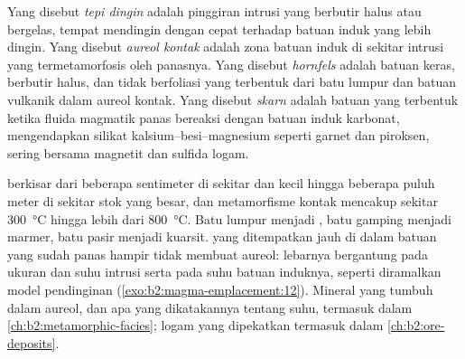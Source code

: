 \begin{definition}\label{def:b2:magma-emplacement:aureole}
Yang disebut \emph{tepi dingin} adalah pinggiran intrusi yang berbutir halus atau bergelas,
tempat  mendingin dengan cepat terhadap batuan induk yang lebih dingin. Yang disebut
\emph{aureol kontak} adalah zona batuan induk di sekitar
intrusi yang termetamorfosis oleh panasnya. Yang disebut \emph{hornfels} adalah
batuan keras, berbutir halus, dan tidak berfoliasi yang terbentuk dari batu lumpur dan batuan vulkanik dalam
aureol kontak. Yang disebut \emph{skarn} adalah batuan yang terbentuk ketika fluida magmatik
panas bereaksi dengan batuan induk karbonat, mengendapkan silikat kalsium--besi--magnesium
seperti garnet dan piroksen, sering bersama magnetit dan sulfida logam.
\end{definition}

 berkisar dari beberapa sentimeter di sekitar  dan  kecil hingga
beberapa puluh meter di sekitar stok yang besar, dan metamorfisme kontak mencakup
sekitar \qty{300}{\celsius} hingga lebih dari \qty{800}{\celsius}. Batu lumpur menjadi
, batu gamping menjadi marmer, batu pasir menjadi kuarsit.  yang ditempatkan jauh
di dalam batuan yang sudah panas hampir tidak membuat aureol: lebarnya bergantung pada
ukuran dan suhu intrusi serta pada suhu batuan induknya, seperti
diramalkan model pendinginan (\cref{exo:b2:magma-emplacement:12}). Mineral yang tumbuh dalam aureol,
dan apa yang dikatakannya tentang suhu, termasuk dalam \cref{ch:b2:metamorphic-facies};
logam yang dipekatkan  termasuk dalam \cref{ch:b2:ore-deposits}.

